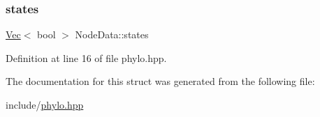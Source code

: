 \subsubsection{\texorpdfstring{states}{states}}
{\footnotesize\ttfamily \hyperlink{phylo_8hpp_a7966e901999842222671212316797352}{Vec}$<$ bool $>$ Node\+Data\+::states}



Definition at line 16 of file phylo.\+hpp.



The documentation for this struct was generated from the following file\+:\begin{DoxyCompactItemize}
\item 
include/\hyperlink{phylo_8hpp}{phylo.\+hpp}\end{DoxyCompactItemize}
